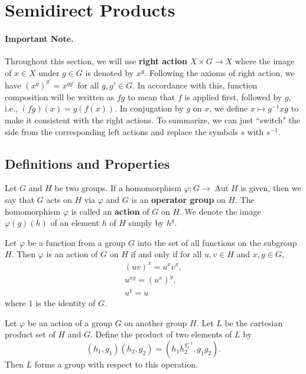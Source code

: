 \section{Semidirect Products}
\paragraph{Important Note.} Throughout this section, we will use \textbf{right action} $X\times G\rightarrow X$ where the image of $x\in X$ under $g\in G$ is denoted by $x^g$. Following the axioms of right action, we have $(x^g)^{g'} = x^{gg'}$ for all $g,g'\in G$. In accordance with this, function composition will be written as $fg$ to mean that $f$ is applied first, followed by $g$, i.e., $(fg)(x) = g(f(x))$. In conjugation by $g$ on $x$, we define $x\mapsto g^{-1}xg$ to make it consistent with the right actions.  To summarize, we can just ``switch" the side from the corresponding left actions and replace the symbols $s$ with $s^{-1}$.
\subsection{Definitions and Properties}
\begin{definition}
	Let $G$ and $H$ be two groups. If a homomorphism $\varphi:G \to \operatorname{Aut} H$ is given, then we say that $G$ acts on $H$ via $\varphi$ and $G$ is an \textbf{operator group} on $H$. The homomorphism $\varphi$ is called an \textbf{action} of $G$ on $H$. We denote the image $\varphi(g)(h)$ of an element $h$ of $H$ simply by $h^g$.
\end{definition}

\begin{proposition}
	Let $\varphi$ be a function from a group $G$ into the set of all functions on the subgroup $H$. Then $\varphi$ is an action of $G$ on $H$ if and only if for all $u, v \in H$ and $x, y \in G$,
	\begin{gather*}
		(uv)^x = u^x v^x,
		\\
		u^{xy} = (u^x)^y,
		\\
		u^1 = u
	\end{gather*}
	where $1$ is the identity of $G$.
\end{proposition} 
\begin{proposition} \label{prop-semidirect-prod}
	Let $\varphi$ be an action of a group $G$ on another group $H$. Let $L$ be the cartesian product set of $H$ and $G$. Define the product of two elements of $L$ by
	$$(h_1,g_1)(h_2,g_2) = (h_1h_2^{g_1^{-1}}, g_1g_2).$$
	Then $L$ forms a group with respect to this operation. 
\end{proposition}

